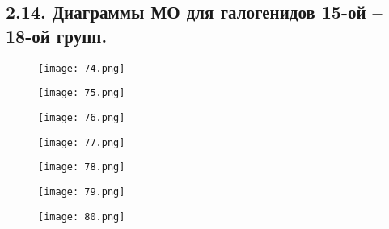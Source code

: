 
\subsection{2.14.  Диаграммы МО для галогенидов 15-ой – 18-ой групп.} 

\par\bigskip
 
 \begin{figure}[H]
 	\centering
 	{\texttt{[image: 74.png]}}
 \end{figure}

\begin{figure}[H]
	\centering
	{\texttt{[image: 75.png]}}
\end{figure}
\begin{figure}[H]
	\centering
	{\texttt{[image: 76.png]}}
\end{figure}
\begin{figure}[H]
	\centering
	{\texttt{[image: 77.png]}}
\end{figure}
\begin{figure}[H]
	\centering
	{\texttt{[image: 78.png]}}
\end{figure}
\begin{figure}[H]
	\centering
	{\texttt{[image: 79.png]}}
\end{figure}
\begin{figure}[H]
	\centering
	{\texttt{[image: 80.png]}}
\end{figure}
 	